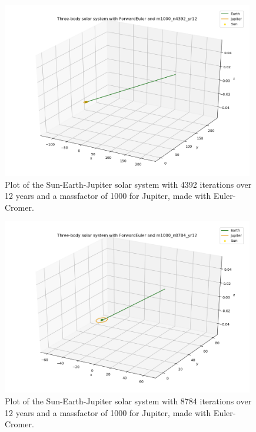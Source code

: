 \documentclass{article}
\begin{document}
    \begin{figure}[H]
        \centering
        \includegraphics[width = 11cm]{img/plot3D_S_E_J_F_m1000_n4392_yr12.png}
        \caption{Plot of the Sun-Earth-Jupiter solar system with 4392 iterations over 12 years and a massfactor of 1000 for Jupiter, made with Euler-Cromer.}
        \label{fig:plot3D_S_E_J_F_m1000_n4392_yr12}
    \end{figure}

    \begin{figure}[H]
        \centering
        \includegraphics[width = 11cm]{img/plot3D_S_E_J_F_m1000_n8784_yr12.png}
        \caption{Plot of the Sun-Earth-Jupiter solar system with 8784 iterations over 12 years and a massfactor of 1000 for Jupiter, made with Euler-Cromer.}
        \label{fig:plot3D_S_E_J_F_m1000_n8784_yr12}
    \end{figure}
\end{document}
